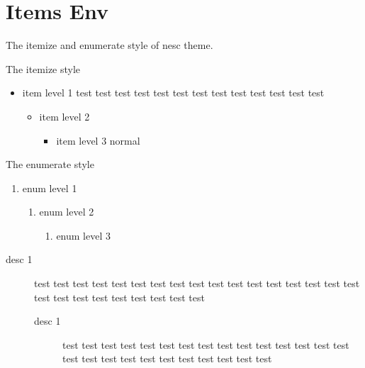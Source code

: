 
\section{Items Env}

\begin{frame}[allowframebreaks, t]
  The itemize and enumerate style of nesc theme.
  \par
  The itemize style
  \begin{itemize}
    \item item level 1
    test test test test test test test test test test test test test
    \begin{itemize}
      \item item level 2
      \begin{itemize}
        \item item level 3
          normal
      \end{itemize}
    \end{itemize}
  \end{itemize}

  The enumerate style
  \begin{enumerate}
    \item enum level 1
    \begin{enumerate}
      \item enum level 2
      \begin{enumerate}
        \item enum level 3
      \end{enumerate}
    \end{enumerate}
  \end{enumerate}

  \begin{description}
    \item[desc 1]
      test test test test test test test test test test test test test
      test test test test test test test test test test test test test
    \begin{description}
      \item[desc 1]
        test test test test test test test test test test test test test
        test test test test test test test test test test test test test
    \end{description}
  \end{description}
\end{frame}